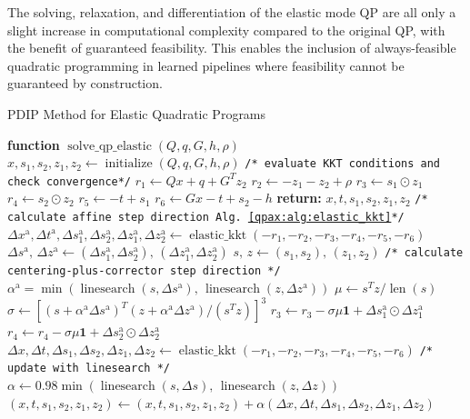     The solving, relaxation, and differentiation of the elastic mode QP are all only a slight increase in computational complexity compared to the original QP, with the benefit of guaranteed feasibility. This enables the inclusion of always-feasible quadratic programming in learned pipelines where feasibility cannot be guaranteed by construction.
%
%
\begin{algorithm}
\caption{PDIP Method for Elastic Quadratic Programs}\label{qpax:alg:elastic_pdip}
\begin{algorithmic}[1]
\State \textbf{function} $\operatorname{solve\_qp\_elastic}(Q,q, G,h, \rho)$ %
\State $x, s_1, s_2, z_1, z_2 \gets \operatorname{initialize}(Q,q, G,h, \rho)$ \Comment{\ref{qpax:sec:elastic_init}}
\State \texttt{/* evaluate KKT conditions and check convergence*/}
\State $r_1 \gets Qx + q  + G^Tz_2$ %
\State $r_2 \gets -z_1 - z_2 + \rho$ 
\State $r_3 \gets s_1 \odot z_1$ 
\State $r_4 \gets s_2 \odot z_2$ 
\State $r_5 \gets -t + s_1 $ 
\State $r_6 \gets Gx - t + s_2 - h$
\State \textbf{return:} $x, t, s_1, s_2, z_1, z_2$
\EndIf 
\State 
\State \texttt{/* calculate affine step direction Alg. \eqref{qpax:alg:elastic_kkt}*/}
\State $\Delta x^\text{a}, \Delta t^\text{a}, \Delta s_1^\text{a}, \Delta s_2^\text{a}, \Delta z_1^\text{a}, \Delta z_2^\text{a}\gets \operatorname{elastic\_kkt}(-r_1, -r_2, -r_3, -r_4, -r_5, -r_6)$ 
\State $\Delta s^\text{a},\, \Delta z^\text{a} \gets (\Delta s_1^\text{a}, \Delta s_2^\text{a}), \,(\Delta z_1^\text{a}, \Delta z_2^\text{a})$
\State $s,\, z \gets (s_1,s_2), \, (z_1, z_2)$
\State \texttt{/* calculate centering-plus-corrector step direction */}
\State $\alpha^\text{a} = \min( \operatorname{linesearch}(s, \Delta s^\text{a}),\, \operatorname{linesearch}(z, \Delta z^\text{a}) )$ \Comment{\eqref{qpax:sec:background:linesearch}}
\State $\mu \gets s^Tz/\operatorname{len}(s)$
\State $\sigma \gets [(s + \alpha^\text{a} \Delta s^\text{a})^T(z + \alpha^\text{a}\Delta z^\text{a})/(s^Tz)]^3$
\State $r_3 \gets r_3 - \sigma \mu \mathbf{1} + \Delta s_1^\text{a} \odot \Delta z_1^\text{a}$
\State $r_4 \gets r_4 - \sigma \mu \mathbf{1} + \Delta s_2^\text{a} \odot \Delta z_2^\text{a}$
\State $\Delta x, \Delta t, \Delta s_1, \Delta s_2, \Delta z_1, \Delta z_2 \gets \operatorname{elastic\_kkt}(-r_1, -r_2, -r_3, -r_4, -r_5, -r_6)$ 
\State 
\State \texttt{/* update with linesearch */}
\State $\alpha \gets 0.98 \min(\operatorname{linesearch}(s, \Delta s),\, \operatorname{linesearch}(z, \Delta z))$ 
\State $(x, t, s_1, s_2, z_1, z_2) \gets (x, t, s_1, s_2, z_1, z_2)  + \alpha(\Delta x, \Delta t, \Delta s_1, \Delta s_2,  \Delta z_1, \Delta z_2)$
\EndFor
\end{algorithmic}
\end{algorithm}
